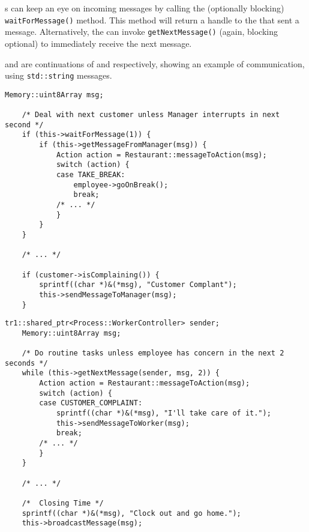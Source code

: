 s can keep an eye on incoming messages by calling the
(optionally blocking) \texttt{wait\-For\-Message()} method.  This method will
return a handle to the  that sent a message.  Alternatively, the
 can invoke \texttt{get\-Next\-Message()} (again, blocking 
optional) to immediately receive the next message.

 and 
 are continuations of
 and 
respectively, showing an example of communication, using \texttt{std::string}
messages.

\begin{lstlisting}[caption={\class{Worker} Communication}, label=process-worker-communication-example]
	Memory::uint8Array msg;

	/* Deal with next customer unless Manager interrupts in next second */
	if (this->waitForMessage(1)) {
		if (this->getMessageFromManager(msg)) {
			Action action = Restaurant::messageToAction(msg);
			switch (action) {
			case TAKE_BREAK:
				employee->goOnBreak();
				break;
			/* ... */
			}
		}
	}
	
	/* ... */
	
	if (customer->isComplaining()) {
		sprintf((char *)&(*msg), "Customer Complant");
		this->sendMessageToManager(msg);
	}
\end{lstlisting}
\begin{lstlisting}[caption={\class{Manager} Communication}, label=process-manager-communication-example]
	tr1::shared_ptr<Process::WorkerController> sender;
	Memory::uint8Array msg;
	
	/* Do routine tasks unless employee has concern in the next 2 seconds */
	while (this->getNextMessage(sender, msg, 2)) {
		Action action = Restaurant::messageToAction(msg);
		switch (action) {
		case CUSTOMER_COMPLAINT:
			sprintf((char *)&(*msg), "I'll take care of it.");
			this->sendMessageToWorker(msg);
			break;
		/* ... */
		}
	}
	
	/* ... */
	
	/*  Closing Time */
	sprintf((char *)&(*msg), "Clock out and go home.");
	this->broadcastMessage(msg);
\end{lstlisting}
